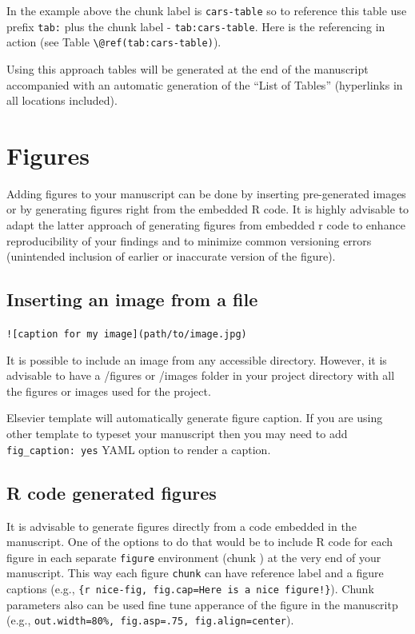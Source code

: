 \documentclass[]{book}
\begin{document}
In the example above the chunk label is \texttt{cars-table} so to
reference this table use prefix \texttt{tab:} plus the chunk label -
\texttt{tab:cars-table}. Here is the referencing in action (see Table
\texttt{\textbackslash{}@ref(tab:cars-table)}).

Using this approach tables will be generated at the end of the
manuscript accompanied with an automatic generation of the ``List of
Tables'' (hyperlinks in all locations included).

\section{Figures}\label{figures}

Adding figures to your manuscript can be done by inserting pre-generated
images or by generating figures right from the embedded R code. It is
highly advisable to adapt the latter approach of generating figures from
embedded r code to enhance reproducibility of your findings and to
minimize common versioning errors (unintended inclusion of earlier or
inaccurate version of the figure).

\subsection{Inserting an image from a
file}\label{inserting-an-image-from-a-file}

\texttt{!{[}caption\ for\ my\ image{]}(path/to/image.jpg)}

It is possible to include an image from any accessible directory.
However, it is advisable to have a /figures or /images folder in your
project directory with all the figures or images used for the project.

Elsevier template will automatically generate figure caption. If you are
using other template to typeset your manuscript then you may need to add
\texttt{fig\_caption:\ yes} YAML option to render a caption.

\subsection{R code generated figures}\label{r-code-generated-figures}

It is advisable to generate figures directly from a code embedded in the
manuscript. One of the options to do that would be to include R code for
each figure in each separate \texttt{figure} environment (chunk ) at the
very end of your manuscript. This way each figure \texttt{chunk} can
have reference label and a figure captions (e.g.,
\texttt{\{r\ nice-fig,\ fig.cap=\textquotesingle{}Here\ is\ a\ nice\ figure!\textquotesingle{}\}}).
Chunk parameters also can be used fine tune apperance of the figure in
the manuscritp (e.g.,
\texttt{out.width=\textquotesingle{}80\%\textquotesingle{},\ fig.asp=.75,\ fig.align=\textquotesingle{}center\textquotesingle{}}).
\end{document}
